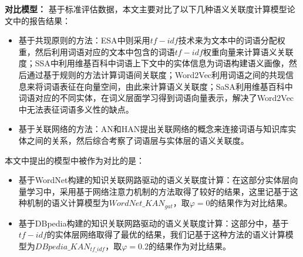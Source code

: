\textbf{对比模型：}
基于标准评估数据，本文主要对比了以下几种语义关联度计算模型论文中的报告结果：
\begin{itemize}
    \item 基于共现原则的方法：ESA\cite{aaai/StrubeP06}中则采用$tf-idf$技术来为文本中的词语分配权重，然后利用词语对应的文本中包含的词语$tf-idf$权重向量来计算语义关联度；SSA\cite{aaai/HassanM11}中利用维基百科中词语上下文中的实体信息为词语构建语义画像，然后通过基于规则的方法计算词语间关联度；Word2Vec\cite{corr/Mikolov13}利用词语之间的共现信息来将词语表征在向量空间，由此来计算语义关联度；SaSA\cite{aaai/WuG15}利用维基百科中词语对应的不同实体，在词义层面学习得到词语向量表示，解决了Word2Vec中无法表征词语多义性的缺点。
    \item 基于关联网络的方法：AN\cite{aaai/ZhangZH15}和HAN\cite{aaai/GongXH18}提出关联网络的概念来连接词语与知识库实体之间的关系，然后综合考察了词语层与实体层的语义关联度。
\end{itemize}

本文中提出的模型中被作为对比的是：
\begin{itemize}
    \item 基于WordNet构建的知识关联网路驱动的语义关联度计算：在这部分实体层向量学习中，采用基于网络注意力机制的方法取得了较好的结果，这里记基于这种机制的语义计算模型为$WordNet\_KAN_{gat}$，取$\varphi=0$的结果作为对比结果。
    \item 基于DBpedia构建的知识关联网路驱动的语义关联度计算：这部分中，基于$tf-idf$的实体层网络取得了最优的结果，我们记基于这种方法的语义计算模型为$DBpedia\_KAN_{tf\_idf}$，取$\varphi=0.2$的结果作为对比结果。
\end{itemize}


